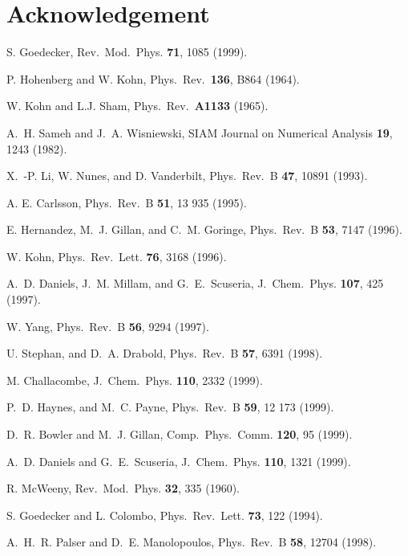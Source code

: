 \commentoutA{\documentclass[superbib,aps,prb,epsfig,floats,twocolumn]{revtex4}}
\begin{document}
\section{Acknowledgement}

\begin{references}

 S. Goedecker,
Rev.\ Mod.\ Phys. {\bf 71}, 1085 (1999).

 P. Hohenberg and W. Kohn,
Phys.\ Rev.\ {\bf 136}, B864 (1964).

 W. Kohn and L.J. Sham,
Phys.\ Rev.\ {\bf A1133} (1965).

  A.\ H. Sameh and J.\ A. Wisniewski,
SIAM Journal on Numerical Analysis {\bf 19}, 1243 (1982).

 X.\ -P. Li, W. Nunes, and D. Vanderbilt,
Phys.\ Rev.\ B {\bf 47}, 10891 (1993).

 A. E. Carlsson,
Phys.\ Rev.\ B {\bf 51}, 13 935 (1995).

 E. Hernandez, M.\ J. Gillan, and C.\ M. Goringe,
Phys.\ Rev.\ B {\bf 53}, 7147 (1996).

 W. Kohn,
Phys.\ Rev.\ Lett. {\bf 76}, 3168 (1996).

 A.\ D. Daniels, J.\ M. Millam, and G.\ E.\ Scuseria,
J.\ Chem.\ Phys. {\bf 107}, 425 (1997).

 W. Yang,
Phys.\ Rev.\ B {\bf 56}, 9294 (1997).

 U. Stephan, and D.\ A. Drabold,
Phys.\ Rev.\ B {\bf 57}, 6391 (1998).

 M. Challacombe,
J.\ Chem.\ Phys. {\bf 110}, 2332 (1999).

 P.\ D. Haynes, and M.\ C. Payne,
Phys.\ Rev.\ B {\bf 59}, 12 173 (1999).

 D.\ R. Bowler and M.\ J. Gillan,
Comp.\ Phys.\ Comm. {\bf 120}, 95 (1999).

 A.\ D. Daniels and G.\ E.\ Scuseria,
J.\ Chem.\ Phys. {\bf 110}, 1321 (1999).

 R. McWeeny,
Rev.\ Mod.\ Phys. {\bf 32}, 335 (1960).

 S. Goedecker and L. Colombo,
Phys.\ Rev.\ Lett. {\bf 73}, 122 (1994).

 A.\ H.\ R. Palser and D.\ E. Manolopoulos,
Phys.\ Rev.\ B {\bf 58}, 12704 (1998). 


\end{references}
\end{document}
